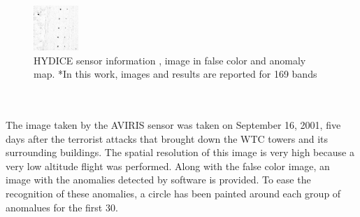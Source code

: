 \begin{figure}[!ht]
\begin{minipage}[t]{0.28\linewidth}
\end{minipage}
\begin{minipage}[t]{0.28\linewidth}
\includegraphics[width=\linewidth, frame]{figures/hydice_rx.png}
\end{minipage}
    \caption[HYDICE sensor information and used dataset]{HYDICE sensor information \cite{hydice_sensor}, image in false color and anomaly map. *In this work, images and results are reported for 169 bands}
  \end{figure}
\\
\\
The image taken by the AVIRIS sensor was taken on September 16, 2001, five days after the terrorist attacks that brought down the WTC towers and its surrounding buildings. The spatial resolution of this image is very high because a very low altitude flight was performed. Along with the false color image, an image with the anomalies detected by software is provided. To ease the recognition of these anomalies, a circle has been painted around each group of anomalues for the first 30.
